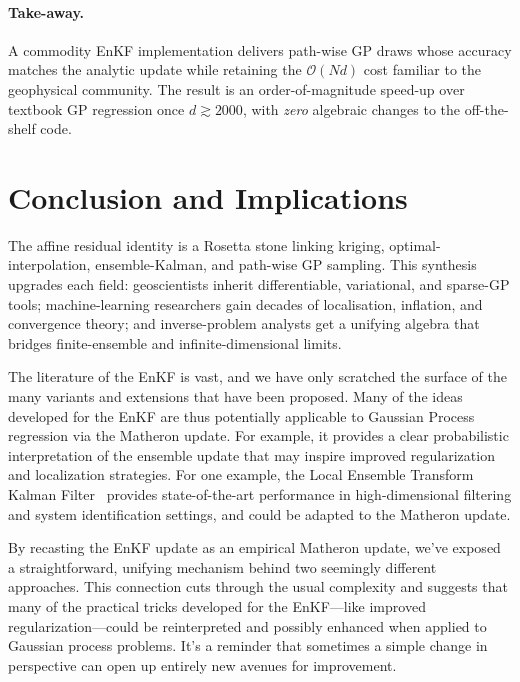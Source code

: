 \documentclass[wcp]{jmlr} %
\begin{document}
\paragraph{Take-away.}
A commodity EnKF implementation delivers path-wise GP draws whose accuracy matches the
analytic update while retaining the $\mathcal O(Nd)$ cost familiar to
the geophysical community.
The result is an order-of-magnitude speed-up
over textbook GP regression once $d\!\gtrsim\!2000$, with \emph{zero}
algebraic changes to the off-the-shelf code.



\section{Conclusion and Implications}

The affine residual identity is a Rosetta stone linking kriging, optimal-interpolation, ensemble-Kalman, and path-wise GP sampling. This synthesis upgrades each field: geoscientists inherit differentiable, variational, and sparse-GP tools; machine-learning researchers gain decades of localisation, inflation, and convergence theory; and inverse-problem analysts get a unifying algebra that bridges finite-ensemble and infinite-dimensional limits.

The literature of the EnKF is vast, and we have only scratched the surface of the many variants and extensions that have been proposed.
Many of the ideas developed for the EnKF are thus potentially applicable to Gaussian Process regression via the Matheron update.
For example, it provides a clear probabilistic interpretation of the ensemble update that may inspire improved regularization and localization strategies.
For one example, the Local Ensemble Transform Kalman Filter~\citep{Bocquet2020Online} provides state-of-the-art performance in high-dimensional filtering and system identification settings, and could be adapted to the Matheron update.

By recasting the EnKF update as an empirical Matheron update, we’ve exposed a straightforward, unifying mechanism behind two seemingly different approaches. This connection cuts through the usual complexity and suggests that many of the practical tricks developed for the EnKF—like improved regularization—could be reinterpreted and possibly enhanced when applied to Gaussian process problems. It’s a reminder that sometimes a simple change in perspective can open up entirely new avenues for improvement.


\end{document}
